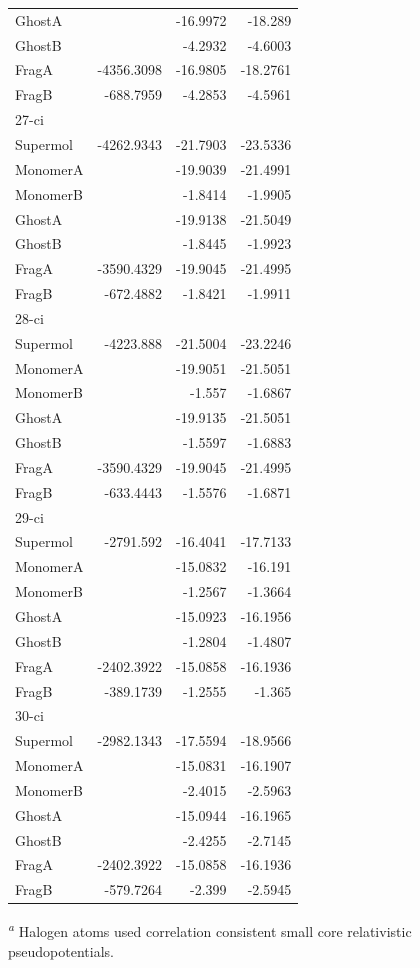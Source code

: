 \documentclass[journal=jctcce,manuscript=article]{achemso}
\begin{document}
\begin{spacing}{1}
\begin{longtable}{lRRR}
    GhostA &       & -16.9972 & -18.289 \\
    GhostB &       & -4.2932 & -4.6003 \\
    FragA & -4356.3098 & -16.9805 & -18.2761 \\
    FragB & -688.7959 & -4.2853 & -4.5961 \\
    27-ci &       &       &  \\
    Supermol & -4262.9343 & -21.7903 & -23.5336 \\
    MonomerA &       & -19.9039 & -21.4991 \\
    MonomerB &       & -1.8414 & -1.9905 \\
    GhostA &       & -19.9138 & -21.5049 \\
    GhostB &       & -1.8445 & -1.9923 \\
    FragA & -3590.4329 & -19.9045 & -21.4995 \\
    FragB & -672.4882 & -1.8421 & -1.9911 \\
    28-ci &       &       &  \\
    Supermol & -4223.888 & -21.5004 & -23.2246 \\
    MonomerA &       & -19.9051 & -21.5051 \\
    MonomerB &       & -1.557 & -1.6867 \\
    GhostA &       & -19.9135 & -21.5051 \\
    GhostB &       & -1.5597 & -1.6883 \\
    FragA & -3590.4329 & -19.9045 & -21.4995 \\
    FragB & -633.4443 & -1.5576 & -1.6871 \\
    29-ci &       &       &  \\
    Supermol & -2791.592 & -16.4041 & -17.7133 \\
    MonomerA &       & -15.0832 & -16.191 \\
    MonomerB &       & -1.2567 & -1.3664 \\
    GhostA &       & -15.0923 & -16.1956 \\
    GhostB &       & -1.2804 & -1.4807 \\
    FragA & -2402.3922 & -15.0858 & -16.1936 \\
    FragB & -389.1739 & -1.2555 & -1.365 \\
    30-ci &       &       &  \\
    Supermol & -2982.1343 & -17.5594 & -18.9566 \\
    MonomerA &       & -15.0831 & -16.1907 \\
    MonomerB &       & -2.4015 & -2.5963 \\
    GhostA &       & -15.0944 & -16.1965 \\
    GhostB &       & -2.4255 & -2.7145 \\
    FragA & -2402.3922 & -15.0858 & -16.1936 \\
    FragB & -579.7264 & -2.399 & -2.5945
  \label{tab:s30l_tpss}
\end{longtable}
\vspace{-0.3cm}
\textsuperscript{\emph{a}} Halogen atoms used correlation consistent
small core relativistic pseudopotentials.\cite{doi:10.1063/1.1622924,doi:10.1021/jp065887l}


\end{spacing}
\end{document}
